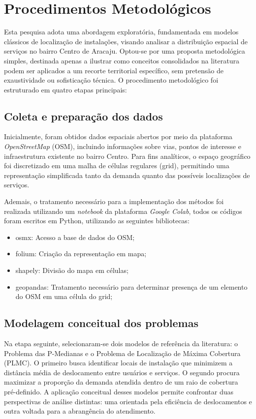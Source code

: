 \documentclass[12pt]{article}
\begin{document}
\section{Procedimentos Metodológicos}

Esta pesquisa adota uma abordagem exploratória, fundamentada em modelos clássicos de localização de instalações, visando analisar a distribuição espacial de serviços no bairro Centro de Aracaju. Optou-se por uma proposta metodológica simples, destinada apenas a ilustrar como conceitos consolidados na literatura podem ser aplicados a um recorte territorial específico, sem pretensão de exaustividade ou sofisticação técnica. O procedimento metodológico foi estruturado em quatro etapas principais:

\subsection{Coleta e preparação dos dados}

Inicialmente, foram obtidos dados espaciais abertos por meio da plataforma \textit{OpenStreetMap} (OSM), incluindo informações sobre vias, pontos de interesse e infraestrutura existente no bairro Centro. Para fins analíticos, o espaço geográfico foi discretizado em uma malha de células regulares (grid), permitindo uma representação simplificada tanto da demanda quanto das possíveis localizações de serviços.

Ademais, o tratamento necessário para a implementação dos métodos foi realizada utilizando um \textit{notebook} da plataforma \textit{Google Colab}, todos os códigos foram escritos em Python, utilizando as seguintes bibliotecas:

\begin{itemize}
    \item osmx: Acesso a base de dados do OSM;
    \item folium: Criação da representação em mapa;
    \item shapely: Divisão do mapa em células;
    \item geopandas: Tratamento necessário para determinar presença de um elemento do OSM em uma célula do grid;
\end{itemize}

\subsection{Modelagem conceitual dos problemas}

Na etapa seguinte, selecionaram-se dois modelos de referência da literatura: o Problema das P-Medianas e o Problema de Localização de Máxima Cobertura (PLMC). O primeiro busca identificar locais de instalação que minimizem a distância média de deslocamento entre usuários e serviços. O segundo procura maximizar a proporção da demanda atendida dentro de um raio de cobertura pré-definido. A aplicação conceitual desses modelos permite confrontar duas perspectivas de análise distintas: uma orientada pela eficiência de deslocamentos e outra voltada para a abrangência do atendimento.
\end{document}
